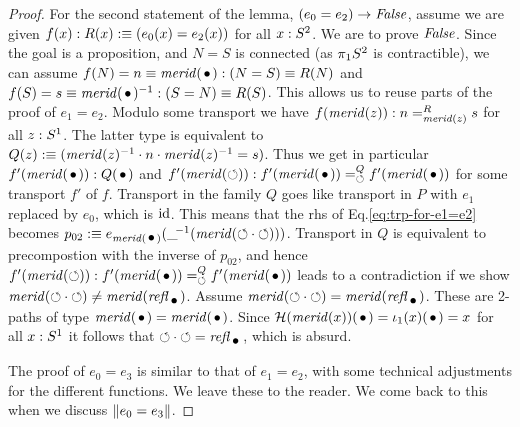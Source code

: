 \documentclass[english,a4]{article}
\begin{document}
\begin{proof}
For the second statement of the lemma, $(e_0 = e_2)\to\mathop{\mathit{False}}$,
assume we are given $f(x):R(x)\mathrel{\hbox{:}\mkern-5mu\equiv}(e_0(x)=e_2(x))$ for all $x:{S^2}$.
We are to prove $\mathop{\mathit{False}}$. Since the goal is a proposition,
and $N=S$ is connected (as $\pi_1 {S^2}$ is contractible),
we can assume $f(N)=n\jdeq\mrd(\base):(N=S)\jdeq R(N)$ and 
$f(S)=s\jdeq\mrd(\base)^{-1}:(S=N)\jdeq R(S)$.
This allows us to reuse parts of the proof of $e_1 = e_2$.
Modulo some transport we have $f(\mathit{merid}(z)): n=^R_{\mathit{merid}(z)}s$
for all $z:{S^1}$. The latter type is equivalent to
$Q(z)\mathrel{\hbox{:}\mkern-5mu\equiv}(\mathit{merid}(z)^{-1}\cdot n\cdot \mathit{merid}(z)^{-1} = s)$.
Thus we get in particular $f'(\mrd(\base)): Q(\base)$ and 
$f'(\mrd(\Sloop)): f'(\mrd(\base))=^Q_{\Sloop}f'(\mrd(\base))$
for some transport $f'$ of $f$.
Transport in the family $Q$ goes like transport in $P$ with $e_1$
replaced by $e_0$, which is $\mathord{\mathrm{id}}$. 
This means that the rhs of Eq.\ref{eq:trp-for-e1=e2} becomes
$p_{02}\defeq e_{\mrd(\base)}(\_\!^{-1}(\mrd(\Sloop\cdot\Sloop)))$.
Transport in $Q$ is equivalent to precompostion with the inverse of $p_{02}$,
and hence $f'(\mrd(\Sloop)): f'(\mrd(\base))=^Q_{\Sloop}f'(\mrd(\base))$
leads to a contradiction if we show
$\mrd(\Sloop\cdot\Sloop) \neq \mrd(\refl{\base})$.
Assume $\mrd(\Sloop\cdot\Sloop) = \mrd(\refl{\base})$.
These are 2-paths of type $\mrd(\base)=\mrd(\base)$.
Since $\hopffam(\mrd(x))(\base) = \iota_1(x)(\base) = x$ for all $x:{S^1}$
it follows that $\Sloop\cdot\Sloop = \refl{\base}$, which is absurd.

The proof of $e_0 = e_3$ is similar to that of $e_1 = e_2$, with some
technical adjustments for the different functions. We leave these to the
reader. We come back to this when we discuss $\lVert e_0 = e_3\rVert$.
\end{proof}
\end{document}
